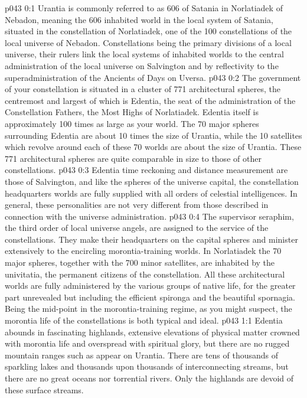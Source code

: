 \author{Malavatia Melchizedek}
\vs p043 0:1 Urantia is commonly referred to as 606 of Satania in Norlatiadek of Nebadon, meaning the 606 inhabited world in the local system of Satania, situated in the constellation of Norlatiadek, one of the 100 constellations of the local universe of Nebadon. Constellations being the primary divisions of a local universe, their rulers link the local systems of inhabited worlds to the central administration of the local universe on Salvington and by reflectivity to the superadministration of the Ancients of Days on Uversa.
\vs p043 0:2 \pc The government of your constellation is situated in a cluster of 771 architectural spheres, the centremost and largest of which is Edentia, the seat of the administration of the Constellation Fathers, the Most Highs of Norlatiadek. Edentia itself is approximately 100 times as large as your world. The 70 major spheres surrounding Edentia are about 10 times the size of Urantia, while the 10 satellites which revolve around each of these 70 worlds are about the size of Urantia. These 771 architectural spheres are quite comparable in size to those of other constellations.
\vs p043 0:3 \pc Edentia time reckoning and distance measurement are those of Salvington, and like the spheres of the universe capital, the constellation headquarters worlds are fully supplied with all orders of celestial intelligences. In general, these personalities are not very different from those described in connection with the universe administration.
\vs p043 0:4 The supervisor seraphim, the third order of local universe angels, are assigned to the service of the constellations. They make their headquarters on the capital spheres and minister extensively to the encircling morontia\hyp{}training worlds. In Norlatiadek the 70 major spheres, together with the 700 minor satellites, are inhabited by the univitatia, the permanent citizens of the constellation. All these architectural worlds are fully administered by the various groups of native life, for the greater part unrevealed but including the efficient spironga and the beautiful spornagia. Being the mid\hyp{}point in the morontia\hyp{}training regime, as you might suspect, the morontia life of the constellations is both typical and ideal.
\vs p043 1:1 Edentia abounds in fascinating highlands, extensive elevations of physical matter crowned with morontia life and overspread with spiritual glory, but there are no rugged mountain ranges such as appear on Urantia. There are tens of thousands of sparkling lakes and thousands upon thousands of interconnecting streams, but there are no great oceans nor torrential rivers. Only the highlands are devoid of these surface streams.

